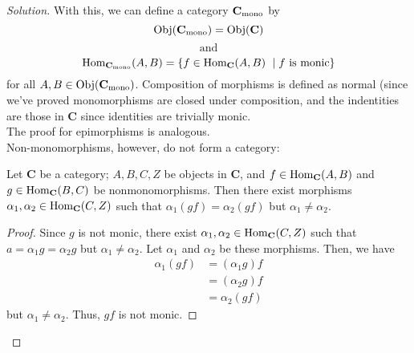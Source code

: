 \documentclass[12pt]{article}
\newenvironment{proposition}[1][Proposition]{\begin{trivlist}
\item[\hskip \labelsep {\bfseries #1.}]}{\end{trivlist}}
\newcommand{\catname}[1]{\normalfont\textbf{#1}}
\newcommand{\Hom}{\text{Hom}}
\newcommand{\Objj}{\text{Obj}}
\newcommand{\Obj}[1]{\text{Obj}(\catname{C})}
\newenvironment{solution}
  {\renewcommand\qedsymbol{$\blacksquare$}\begin{proof}[Solution]}
{\end{proof}}
\newenvironment{sproof}{%
  \renewcommand\qedsymbol{$\square$}
  \begin{proof}
  }{
  \end{proof}
}
\begin{document}
\begin{solution}
      With this, we can define a category $\catname{C}_\text{mono}$ by 
      \begin{equation*}
        \Objj(\catname{C}_\text{mono}) = \Obj{C}
      \end{equation*} 
      \[\text{and} \]
      \begin{equation*}
        \Hom_{\catname{C}_\text{mono}}(A,B) = \{f \in \Hom_{\catname{C}}(A,B)\ \mid f \text{ is monic}\}
      \end{equation*} 
      for all $A, B \in \Objj(\catname{C}_\text{mono})$.
      Composition of morphisms is defined as normal (since we've proved monomorphisms are closed under composition, and the indentities are those in \catname{C} since identities are trivially monic. \\
        The proof for epimorphisms is analogous.\\
        Non-monomorphisms, however, do not form a category:
        \begin{proposition}
          Let \catname{C} be a category;
          $A,B,C,Z$ be objects in \catname{C}, and
          $f\in \Hom_{\catname{C}}(A,B)$ and
          $g\in \Hom_{\catname{C}}(B,C)$
          be nonmonomorphisms. Then there exist morphisms
          $\alpha_1, \alpha_2 \in \Hom_{\catname{C}}(C,Z)$ such that
          $\alpha_1(gf) = \alpha_2(gf)$ but $\alpha_1\neq \alpha_2$.
        \end{proposition}
        \begin{sproof}
          Since $g$ is not monic, there exist $\alpha_1, \alpha_2 \in \Hom_{\catname{C}}(C,Z)$ such that $a=\alpha_1g = \alpha_2g$ but $\alpha_1\neq \alpha_2$. Let $\alpha_1$ and $\alpha_2$ be these morphisms. Then, we have
          \begin{align*}
            \alpha_1(gf) &= (\alpha_1g)f\\
            &= (\alpha_2g)f \\
            &= \alpha_2(gf)
          \end{align*}
          but $\alpha_1\neq \alpha_2$. Thus, $gf$ is not monic.
        \end{sproof}
\end{solution}
\end{document}
